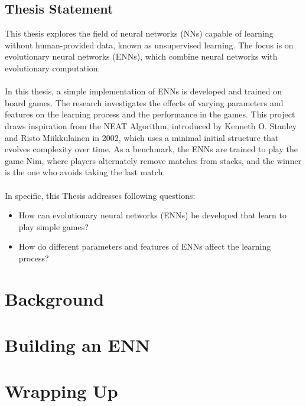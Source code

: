 \documentclass[12pt]{report}
\begin{document}
    \section{Thesis Statement}\label{sec:thesis-statement}
    This thesis explores the field of neural networks (NNs) capable of learning without human-provided data, known as unsupervised learning.
    The focus is on evolutionary neural networks (ENNs), which combine neural networks with evolutionary computation.
    \\ \\
    In this thesis, a simple implementation of ENNs is developed and trained on board games.
    The research investigates the effects of varying parameters and features on the learning process and the performance in the games.
    This project draws inspiration from the NEAT Algorithm, introduced by Kenneth O. Stanley and Risto Miikkulainen in 2002, which uses a minimal initial structure that evolves complexity over time.\cite[p.105-106]{Neat_02}
    As a benchmark, the ENNs are trained to play the game Nim, where players alternately remove matches from stacks, and the winner is the one who avoids taking the last match.
    \\ \\
    In specific, this Thesis addresses following questions:
    \begin{itemize}
        \item How can evolutionary neural networks (ENNs) be developed that learn to play simple games?
        \item How do different parameters and features of ENNs affect the learning process?
    \end{itemize}


    \chapter{Background}\label{ch:background}
    


    \chapter{Building an ENN}\label{ch:designing-an-enn}
    


    \chapter{Wrapping Up}\label{ch:wrapping-up}
    
\end{document}
